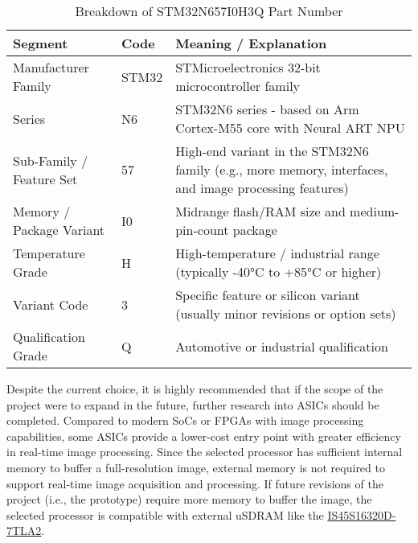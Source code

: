 \documentclass[10pt]{article}
\newcommand{\nl}{\newline \newline}
\begin{document}
\begin{table}[H]
\centering
\begin{tabular}{|l|l|p{8cm}|}
    \hline
\textbf{Segment} & \textbf{Code} & \textbf{Meaning / Explanation} \\
\hline
Manufacturer Family & STM32 & STMicroelectronics 32-bit microcontroller family \\
\hline
Series & N6 & STM32N6 series - based on Arm Cortex-M55 core with Neural ART NPU \\
\hline
Sub-Family / Feature Set & 57 & High-end variant in the STM32N6 family (e.g., more memory, interfaces, and image processing features) \\
\hline
Memory / Package Variant & I0 & Midrange flash/RAM size and medium-pin-count package \\
\hline
Temperature Grade & H & High-temperature / industrial range (typically -40°C to +85°C or higher) \\
\hline
Variant Code & 3 & Specific feature or silicon variant (usually minor revisions or option sets) \\
\hline
Qualification Grade & Q & Automotive or industrial qualification \\
\hline
\end{tabular}
\caption{Breakdown of STM32N657I0H3Q Part Number}
\label{tab:stm32n6-partnumber-n657i0}
\end{table}

Despite the current choice, it is highly recommended that if the scope of the project were to expand in the future, further research into ASICs should be completed.
Compared to modern SoCs or FPGAs with image processing capabilities, some ASICs provide a lower-cost entry point with greater efficiency in real-time image processing.
\nl
Since the selected processor has sufficient internal memory to buffer a full-resolution image, external memory is not required to support real-time image acquisition and processing.
If future revisions of the project (i.e., the prototype) require more memory to buffer the image, the selected processor is compatible with external uSDRAM like the \href{https://au.mouser.com/ProductDetail/ISSI/IS45S16320D-7TLA2?qs=Iq7RKQRjpgqlMjstEZ4V8g%3D%3D}{IS45S16320D-7TLA2}.

\end{document}

